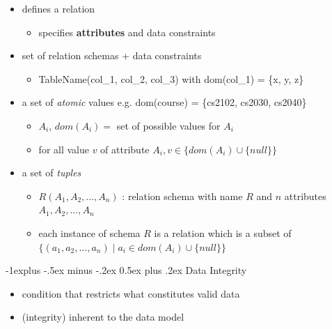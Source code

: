 \documentclass[10pt, landscape]{article}
\makeatletter
\renewcommand{\subsection}{\@startsection{subsection}{2}{0mm}%
  {-1explus -.5ex minus -.2ex}%
  {0.5ex plus .2ex}%
{\normalfont\normalsize\bfseries}}
\makeatother
\begin{document}
\begin{multicols*}{4}
  \begin{itemize}
    \item {} defines a relation 
      \begin{itemize}
        \item specifies \textbf{attributes} and data constraints
      \end{itemize}
    \item {} set of relation schemas + data constraints
      \begin{itemize}
        \item TableName(col\_1, col\_2, col\_3) with dom(col\_1) = \{x, y, z\}
      \end{itemize}
    \item {} a set of \textit{atomic} values e.g. dom(course) = \{cs2102, cs2030, cs2040\}
      \begin{itemize}
        \item $ A_i $, $ dom(A_i) =$ set of possible values for $ A_i $
      \item for all value $ v $ of attribute $ A_i, v \in \{ dom(A_i) \cup \{null\} \} $ 
      \end{itemize}
    \item {} a set of \textit{tuples} 
      \begin{itemize}
        \item $ R(A_1, A_2, \dots, A_n) $ : relation schema with name $ R $ and $ n $ attributes $ A_1, A_2, \dots, A_n $
        \item each instance of schema $ R $ is a relation which is a subset of $ \{(a_1, a_2, \dots, a_n) \mid a_i \in dom(A_i) \cup \{null\}\} $
      \end{itemize}
  \end{itemize}


  \subsection{Data Integrity}
  \begin{itemize}
    \item {} condition that restricts what constitutes valid data
    \item {} (integrity) inherent to the data model 
  \end{itemize}


\end{multicols*}
\end{document}
